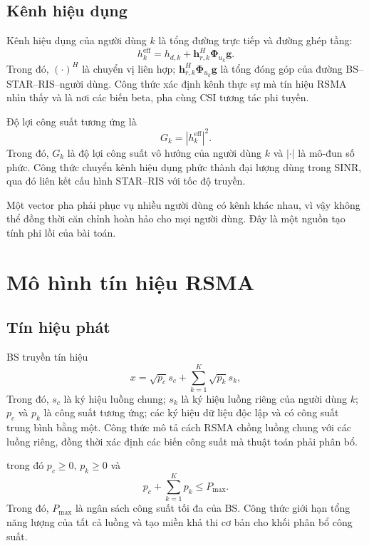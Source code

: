 \subsection{Kênh hiệu dụng}
Kênh hiệu dụng của người dùng $k$ là tổng đường trực tiếp và đường ghép tầng:
\begin{equation}
 h_k^{\mathrm{eff}}=h_{d,k}+\bm h_{r,k}^{H}\bm\Phi_{u_k}\bm g.
 \label{eq:effective-channel-ch2}
\end{equation}
Trong đó, $(\cdot)^H$ là chuyển vị liên hợp; $\bm h_{r,k}^{H}\bm\Phi_{u_k}\bm g$ là tổng đóng góp của đường BS--STAR--RIS--người dùng. Công thức xác định kênh thực sự mà tín hiệu RSMA nhìn thấy và là nơi các biến beta, pha cùng CSI tương tác phi tuyến.

Độ lợi công suất tương ứng là
\begin{equation}
 G_k=\left|h_k^{\mathrm{eff}}\right|^2.
\end{equation}
Trong đó, $G_k$ là độ lợi công suất vô hướng của người dùng $k$ và $|\cdot|$ là mô-đun số phức. Công thức chuyển kênh hiệu dụng phức thành đại lượng dùng trong SINR, qua đó liên kết cấu hình STAR--RIS với tốc độ truyền.

Một vector pha phải phục vụ nhiều người dùng có kênh khác nhau, vì vậy không thể đồng thời căn chỉnh hoàn hảo cho mọi người dùng. Đây là một nguồn tạo tính phi lồi của bài toán.

\section{Mô hình tín hiệu RSMA}
\subsection{Tín hiệu phát}
BS truyền tín hiệu
\begin{equation}
 x=\sqrt{p_c}s_c+\sum_{k=1}^{K}\sqrt{p_k}s_k,
 \label{eq:rsma-transmit-ch2}
\end{equation}
Trong đó, $s_c$ là ký hiệu luồng chung; $s_k$ là ký hiệu luồng riêng của người dùng $k$; $p_c$ và $p_k$ là công suất tương ứng; các ký hiệu dữ liệu độc lập và có công suất trung bình bằng một. Công thức mô tả cách RSMA chồng luồng chung với các luồng riêng, đồng thời xác định các biến công suất mà thuật toán phải phân bổ.

trong đó $p_c\ge0$, $p_k\ge0$ và
\begin{equation}
 p_c+\sum_{k=1}^{K}p_k\le P_{\max}.
 \label{eq:power-budget-ch2}
\end{equation}
Trong đó, $P_{\max}$ là ngân sách công suất tối đa của BS. Công thức giới hạn tổng năng lượng của tất cả luồng và tạo miền khả thi cơ bản cho khối phân bổ công suất.


